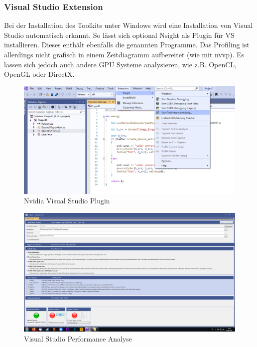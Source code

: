 			    \subsubsection*{Visual Studio Extension}
			    Bei der Installation des Toolkits unter Windows wird eine Installation von Visual Studio automatisch erkannt. So lässt sich optional Nsight als Plugin für VS installieren. Dieses enthält ebenfalls die genannten Programme. Das Profiling ist allerdings nicht grafisch in einem Zeitdiagramm aufbereitet (wie mit nvvp). Es lassen sich jedoch auch andere GPU Systeme analysieren, wie z.B. OpenCL, OpenGL oder DirectX.
                    \begin{figure}[h]
			            \centering
			            \includegraphics[width=\textwidth]{chapter3/pictures/VSplugin.png}
			            \caption{Nvidia Visual Studio Plugin}
			            \label{fig3:vsplugin}
                    \end{figure}
                    \begin{figure}[h]
			            \centering
			            \includegraphics[width=\textwidth]{chapter3/pictures/VSact.png}
			            \caption{Visual Studio Performance Analyse}
			            \label{fig3:vsact}
                    \end{figure}
